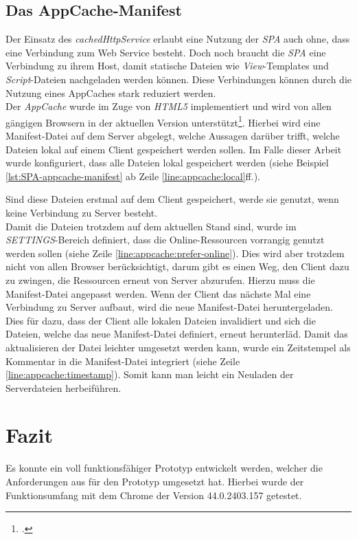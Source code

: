 \subsection{Das AppCache-Manifest}
\label{ssec:appcache-manifest}
Der Einsatz des \textit{cachedHttpService} erlaubt eine Nutzung der \textit{SPA} auch ohne, dass eine Verbindung zum Web Service besteht. Doch noch braucht die \textit{SPA} eine Verbindung zu ihrem Host, damit statische Dateien wie \textit{View}-Templates und \textit{Script}-Dateien nachgeladen werden können. Diese Verbindungen können durch die Nutzung eines AppCaches stark reduziert werden. \\
Der \textit{AppCache} wurde im Zuge von \textit{HTML5} implementiert und wird von allen gängigen Browsern in der aktuellen Version unterstützt\footcite{online:caniuse:appcache}. Hierbei wird eine Manifest-Datei auf dem Server abgelegt, welche Aussagen darüber trifft, welche Dateien lokal auf einem Client gespeichert werden sollen. Im Falle dieser Arbeit wurde konfiguriert, dass alle Dateien lokal gespeichert werden (siehe Beispiel \ref{lst:SPA-appcache-manifest} ab Zeile \ref{line:appcache:local}ff.). 



Sind diese Dateien erstmal auf dem Client gespeichert, werde sie genutzt, wenn keine Verbindung zu Server besteht. \\
Damit die Dateien trotzdem auf dem aktuellen Stand sind, wurde im \textit{SETTINGS}-Bereich definiert, dass die Online-Ressourcen vorrangig genutzt werden sollen (siehe Zeile \ref{line:appcache:prefer-online}). Dies wird aber trotzdem nicht von allen Browser berücksichtigt, darum gibt es einen Weg, den Client dazu zu zwingen, die Ressourcen erneut von Server abzurufen. Hierzu muss die Manifest-Datei angepasst werden. Wenn der Client das nächste Mal eine Verbindung zu Server aufbaut, wird die neue Manifest-Datei heruntergeladen. Dies für dazu, dass der Client alle lokalen Dateien invalidiert und sich die Dateien, welche das neue Manifest-Datei definiert, erneut herunterläd. Damit das aktualisieren der Datei leichter umgesetzt werden kann, wurde ein Zeitstempel als Kommentar in die Manifest-Datei integriert (siehe Zeile \ref{line:appcache:timestamp}). Somit kann man leicht ein Neuladen der Serverdateien herbeiführen. 
\section{Fazit}
Es konnte ein voll funktionsfähiger Prototyp entwickelt werden, welcher die Anforderungen aus für den Prototyp umgesetzt hat. Hierbei wurde der Funktionsumfang mit dem Chrome der Version 44.0.2403.157 getestet.

